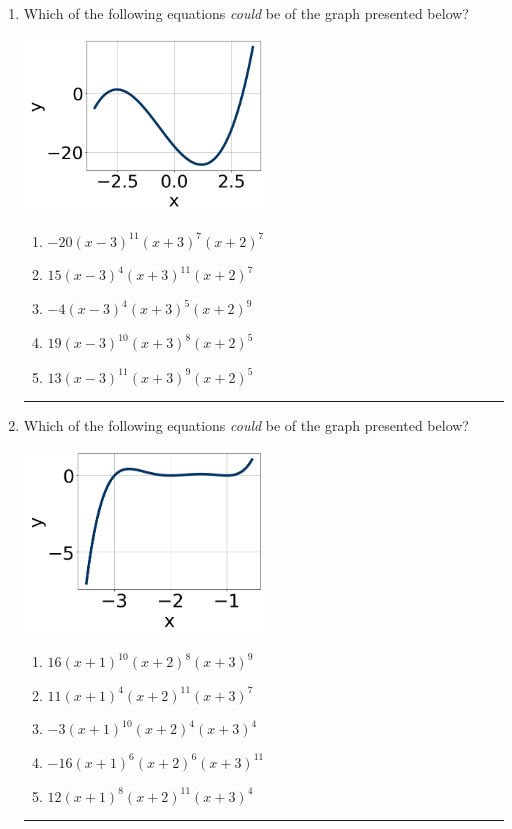 \documentclass[14pt]{extbook}
\newcommand{\litem}[1]{\item#1\hspace*{-1cm}\rule{\textwidth}{0.4pt}}
\begin{document}
\begin{enumerate}
\litem{
Which of the following equations \textit{could} be of the graph presented below?
\begin{center}
    \includegraphics[width=0.5\textwidth]{../Figures/polyGraphToFunctionCopyA.png}
\end{center}
\begin{enumerate}[label=\Alph*.]
\item \( -20(x - 3)^{11} (x + 3)^{7} (x + 2)^{7} \)
\item \( 15(x - 3)^{4} (x + 3)^{11} (x + 2)^{7} \)
\item \( -4(x - 3)^{4} (x + 3)^{5} (x + 2)^{9} \)
\item \( 19(x - 3)^{10} (x + 3)^{8} (x + 2)^{5} \)
\item \( 13(x - 3)^{11} (x + 3)^{9} (x + 2)^{5} \)

\end{enumerate} }
\litem{
Which of the following equations \textit{could} be of the graph presented below?
\begin{center}
    \includegraphics[width=0.5\textwidth]{../Figures/polyGraphToFunctionA.png}
\end{center}
\begin{enumerate}[label=\Alph*.]
\item \( 16(x + 1)^{10} (x + 2)^{8} (x + 3)^{9} \)
\item \( 11(x + 1)^{4} (x + 2)^{11} (x + 3)^{7} \)
\item \( -3(x + 1)^{10} (x + 2)^{4} (x + 3)^{4} \)
\item \( -16(x + 1)^{6} (x + 2)^{6} (x + 3)^{11} \)
\item \( 12(x + 1)^{8} (x + 2)^{11} (x + 3)^{4} \)


\end{enumerate}}
\end{enumerate}
\end{document}
